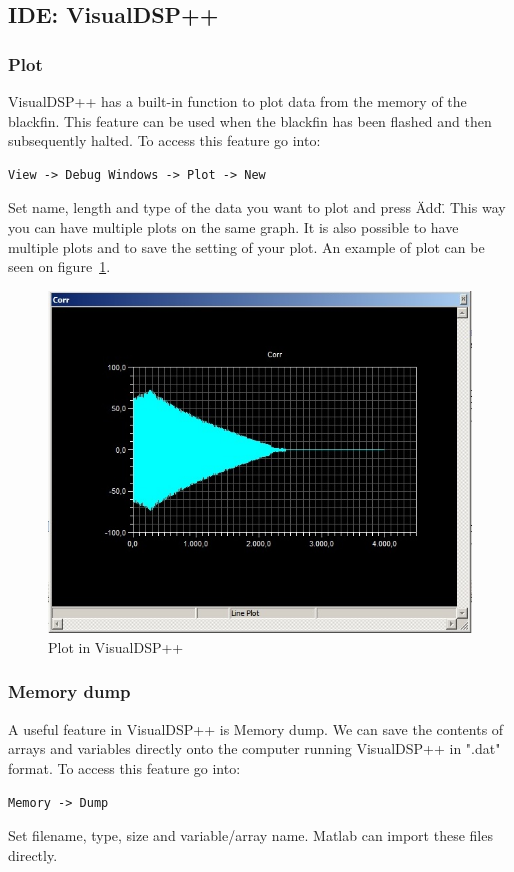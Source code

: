 \subsection{IDE: VisualDSP++}
\subsubsection{Plot}
VisualDSP++ has a built-in function to plot data from the memory of the blackfin. This feature can be used when the blackfin has been flashed and then subsequently halted. To access this feature go into:
\begin{verbatim}
View -> Debug Windows -> Plot -> New
\end{verbatim}
Set name, length and type of the data you want to plot and press \"Add\". This way you can have multiple plots on the same graph. It is also possible to have multiple plots and to save the setting of your plot. An example of plot can be seen on figure~\ref{fig:visualdspplot}.
\begin{figure}[hbpt]
\centering
\includegraphics[scale=0.5]{billeder/visualdspplot}
\caption{Plot in VisualDSP++}
\label{fig:visualdspplot}
\end{figure}
\subsubsection{Memory dump}
A useful feature in VisualDSP++ is Memory dump. We can save the contents of arrays and variables directly onto the computer running VisualDSP++ in ".dat" format. To access this feature go into:
\begin{verbatim}
Memory -> Dump
\end{verbatim}
Set filename, type, size and variable/array name. Matlab can import these files directly.



